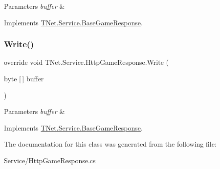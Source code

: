 \begin{DoxyParams}{Parameters}
{\em buffer} & \\
\hline
\end{DoxyParams}


Implements \mbox{\hyperlink{class_t_net_1_1_service_1_1_base_game_response_a1e037de4af1a1fee323cc7efbe9cbc3e}{T\+Net.\+Service.\+Base\+Game\+Response}}.

\mbox{\label{class_t_net_1_1_service_1_1_http_game_response_adab6896df13148c3b3e5e61cd98649e9}} 
\subsubsection{\texorpdfstring{Write()}{Write()}}
{\footnotesize\ttfamily override void T\+Net.\+Service.\+Http\+Game\+Response.\+Write (\begin{DoxyParamCaption}\item[{byte \mbox{[}$\,$\mbox{]}}]{buffer }\end{DoxyParamCaption})\hspace{0.3cm}{\ttfamily [virtual]}}






\begin{DoxyParams}{Parameters}
{\em buffer} & \\
\hline
\end{DoxyParams}


Implements \mbox{\hyperlink{class_t_net_1_1_service_1_1_base_game_response_a2ede5b36253063e68dbe5553a95bf1e2}{T\+Net.\+Service.\+Base\+Game\+Response}}.



The documentation for this class was generated from the following file\+:\begin{DoxyCompactItemize}
\item 
Service/Http\+Game\+Response.\+cs\end{DoxyCompactItemize}

